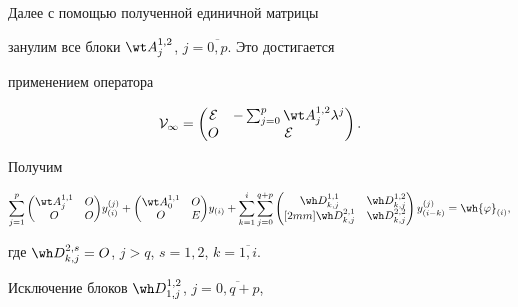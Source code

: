 \begin{pf}
Далее с помощью полученной единичной матрицы


занулим все блоки $\wt A_j^{1,2}$, $j= \overline{0,p}$. Это достигается 


применением оператора 


$$


\cal V_{1}=


\begin{pmatrix}


 \cal E & -\sum_{j=0}^{p}{\wt A_j^{1,2} \lambda^j}\\


 O & \cal E 


\end{pmatrix}.


$$


Получим


$$


\sum_{j=1}^{p}{


{\begin{pmatrix}


 \wt A_j^{1,1} & O \\


 O & O 


\end{pmatrix}}


y_{(i)}^{(j)}}+


{\begin{pmatrix}


 \wt A_0^{1,1} & O\\


 O & E 


\end{pmatrix}}


y_{(i)}+


\sum_{k=1}^{i}{


\sum_{j=0}^{q+p}{ 


\begin{pmatrix} 


 \wh D_{k,j}^{1,1} & \wh D_{k,j}^{1,2} \\ [2mm]


 \wh D_{k,j}^{2,1} & \wh D_{k,j}^{2,2} 


\end{pmatrix}


y_{(i-k)}^{(j)}}}=\wh {\varphi}_{(i)}, 


$$


где $\wh D_{k,j}^{2,s}=O$, $j>q$, $s=1,2$, $k=\overline{1,i}$.


 


Исключение блоков $\wh D_{1,j}^{1,2}$, $j= \overline{0,q+p}$,



\end{pf}
